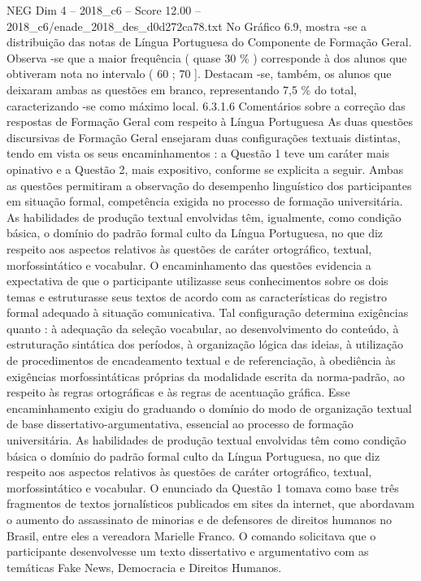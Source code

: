 \begin{textsample}{NEG Dim 4 – 2018\_c6 – Score 12.00 – 2018\_c6/enade\_2018\_des\_d0d272ca78.txt}
No Gráfico 6.9, mostra -se a distribuição das notas de Língua Portuguesa do Componente de Formação Geral.
Observa -se que a maior frequência ( quase 30 \% ) corresponde à dos alunos que obtiveram nota no intervalo ( 60 ; 70 ].
Destacam -se, também, os alunos que deixaram ambas as questões em branco, representando 7,5 \% do total, caracterizando -se como máximo local. 6.3.1.6 Comentários sobre a correção das respostas de Formação Geral com respeito à Língua Portuguesa As duas questões discursivas de Formação Geral ensejaram duas configurações textuais distintas, tendo em vista os seus encaminhamentos : a Questão 1 teve um caráter mais opinativo e a Questão 2, mais expositivo, conforme se explicita a seguir.
Ambas as questões permitiram a observação do desempenho linguístico dos participantes em situação formal, competência exigida no processo de formação universitária.
As habilidades de produção textual envolvidas têm, igualmente, como condição básica, o domínio do padrão formal culto da Língua Portuguesa, no que diz respeito aos aspectos relativos às questões de caráter ortográfico, textual, morfossintático e vocabular.
O encaminhamento das questões evidencia a expectativa de que o participante utilizasse seus conhecimentos sobre os dois temas e estruturasse seus textos de acordo com as características do registro formal adequado à situação comunicativa.
Tal configuração determina exigências quanto : à adequação da seleção vocabular, ao desenvolvimento do conteúdo, à estruturação sintática dos períodos, à organização lógica das ideias, à utilização de procedimentos de encadeamento textual e de referenciação, à obediência às exigências morfossintáticas próprias da modalidade escrita da norma-padrão, ao respeito às regras ortográficas e às regras de acentuação gráfica.
Esse encaminhamento exigiu do graduando o domínio do modo de organização textual de base dissertativo-argumentativa, essencial ao processo de formação universitária.
As habilidades de produção textual envolvidas têm como condição básica o domínio do padrão formal culto da Língua Portuguesa, no que diz respeito aos aspectos relativos às questões de caráter ortográfico, textual, morfossintático e vocabular.
O enunciado da Questão 1 tomava como base três fragmentos de textos jornalísticos publicados em sites da internet, que abordavam o aumento do assassinato de minorias e de defensores de direitos humanos no Brasil, entre eles a vereadora Marielle Franco.
O comando solicitava que o participante desenvolvesse um texto dissertativo e argumentativo com as temáticas Fake News, Democracia e Direitos Humanos.

\end{textsample}
